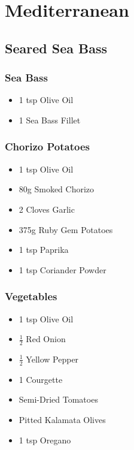 \documentclass[11pt, english]{article}
\begin{document}
\newpage

\section{Mediterranean}

	\subsection{Seared Sea Bass}

		\subsubsection*{Sea Bass}

	\begin{itemize}
        \setlength\itemsep{0cm}
                \item 1 tsp Olive Oil
		\item 1 Sea Bass Fillet
        \end{itemize}

		\subsubsection*{Chorizo Potatoes}

	\begin{itemize}
        \setlength\itemsep{0cm}
                \item 1 tsp Olive Oil
		\item 80g Smoked Chorizo
		\item 2 Cloves Garlic
		\item 375g Ruby Gem Potatoes
		\item 1 tsp Paprika
		\item 1 tsp Coriander Powder
        \end{itemize}

		\subsubsection*{Vegetables}

	\begin{itemize}
        \setlength\itemsep{0cm}
                \item 1 tsp Olive Oil
		\item $\frac{1}{2}$ Red Onion
		\item $\frac{1}{2}$ Yellow Pepper
		\item 1 Courgette
		\item Semi-Dried Tomatoes
		\item Pitted Kalamata Olives
		\item 1 tsp Oregano
        \end{itemize}
\end{document}
